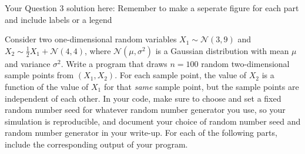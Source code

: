 \documentclass[11pt]{article}
\begin{document}
\begin{enumerate}
	\begin{solution}
    Your Question 3 solution here: Remember to make a seperate figure for each part and include labels or a legend 
    \end{solution}
	\end{enumerate}



Consider two one-dimensional random variables $X_1 \sim \mathcal{N}(3,9)$ and $X_2 \sim \frac{1}{2}X_1+\mathcal{N}(4,4)$,  where $\mathcal{N}(\mu, \sigma^2)$ is a Gaussian  distribution with mean $\mu$ and  variance $\sigma^2$.
Write a program that draws $n=100$ random two-dimensional sample points from $(X_1, X_2)$. For each sample point, the value of $X_2$ is a function of the value of $X_1$ for that {\em same} sample point, but the sample points are independent of each other.
In your code, make sure to choose and set a fixed random number seed for whatever random number generator you use, so your simulation is reproducible, and document your choice of random number seed and random number generator in your write-up.
For each of the following parts, include the corresponding output of your program.
\end{document}
